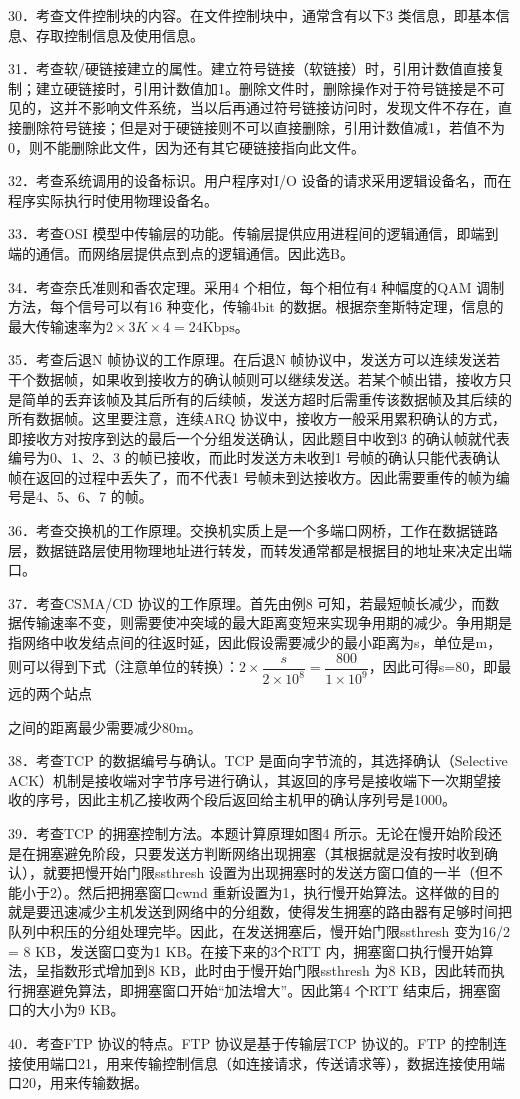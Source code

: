 \documentclass[UTF8,11pt]{ctexart}
\begin{document}
30．考查文件控制块的内容。在文件控制块中，通常含有以下3 类信息，即基本信息、存取控制信息及使用信息。


31．考查软/硬链接建立的属性。建立符号链接（软链接）时，引用计数值直接复制；建立硬链接时，引用计数值加1。删除文件时，删除操作对于符号链接是不可见的，这并不影响文件系统，当以后再通过符号链接访问时，发现文件不存在，直接删除符号链接；但是对于硬链接则不可以直接删除，引用计数值减1，若值不为0，则不能删除此文件，因为还有其它硬链接指向此文件。


32．考查系统调用的设备标识。用户程序对I/O 设备的请求采用逻辑设备名，而在程序实际执行时使用物理设备名。


33．考查OSI 模型中传输层的功能。传输层提供应用进程间的逻辑通信，即端到端的通信。而网络层提供点到点的逻辑通信。因此选B。


34．考查奈氏准则和香农定理。采用4 个相位，每个相位有4 种幅度的QAM 调制方法，每个信号可以有16 种变化，传输4bit 的数据。根据奈奎斯特定理，信息的最大传输速率为\(\displaystyle 2\times3K\times4=24\text{Kbps}\)。


35．考查后退N 帧协议的工作原理。在后退N 帧协议中，发送方可以连续发送若干个数据帧，如果收到接收方的确认帧则可以继续发送。若某个帧出错，接收方只是简单的丢弃该帧及其后所有的后续帧，发送方超时后需重传该数据帧及其后续的所有数据帧。这里要注意，连续ARQ 协议中，接收方一般采用累积确认的方式，即接收方对按序到达的最后一个分组发送确认，因此题目中收到3 的确认帧就代表编号为0、1、2、3 的帧已接收，而此时发送方未收到1 号帧的确认只能代表确认帧在返回的过程中丢失了，而不代表1 号帧未到达接收方。因此需要重传的帧为编号是4、5、6、7 的帧。


36．考查交换机的工作原理。交换机实质上是一个多端口网桥，工作在数据链路层，数据链路层使用物理地址进行转发，而转发通常都是根据目的地址来决定出端口。


37．考查CSMA/CD 协议的工作原理。首先由例8 可知，若最短帧长减少，而数据传输速率不变，则需要使冲突域的最大距离变短来实现争用期的减少。争用期是指网络中收发结点间的往返时延，因此假设需要减少的最小距离为s，单位是m，则可以得到下式（注意单位的转换）：\(\displaystyle 2\times\dfrac{\displaystyle s}{\displaystyle 2\times10^8}=\dfrac{\displaystyle 800}{\displaystyle 1\times10^9}\)，因此可得s=80，即最远的两个站点


之间的距离最少需要减少80m。


38．考查TCP 的数据编号与确认。TCP 是面向字节流的，其选择确认（Selective ACK）机制是接收端对字节序号进行确认，其返回的序号是接收端下一次期望接收的序号，因此主机乙接收两个段后返回给主机甲的确认序列号是1000。


39．考查TCP 的拥塞控制方法。本题计算原理如图4 所示。无论在慢开始阶段还是在拥塞避免阶段，只要发送方判断网络出现拥塞（其根据就是没有按时收到确认），就要把慢开始门限ssthresh 设置为出现拥塞时的发送方窗口值的一半（但不能小于2）。然后把拥塞窗口cwnd 重新设置为1，执行慢开始算法。这样做的目的就是要迅速减少主机发送到网络中的分组数，使得发生拥塞的路由器有足够时间把队列中积压的分组处理完毕。因此，在发送拥塞后，慢开始门限ssthresh 变为16/2 = 8 KB，发送窗口变为1 KB。在接下来的3个RTT 内，拥塞窗口执行慢开始算法，呈指数形式增加到8 KB，此时由于慢开始门限ssthresh 为8 KB，因此转而执行拥塞避免算法，即拥塞窗口开始“加法增大”。因此第4 个RTT 结束后，拥塞窗口的大小为9 KB。


40．考查FTP 协议的特点。FTP 协议是基于传输层TCP 协议的。FTP 的控制连接使用端口21，用来传输控制信息（如连接请求，传送请求等），数据连接使用端口20，用来传输数据。
\end{document}
